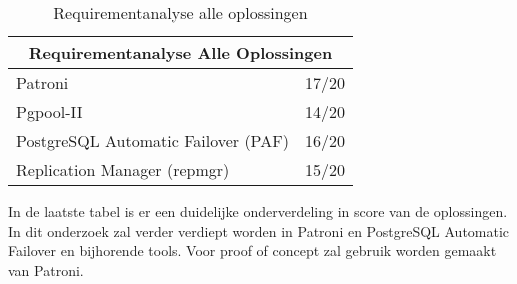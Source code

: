\begin{table}[!h]
    \centering
    \begin{tabular}{ |p{6cm}||p{6cm}|  }
        \hline
        \multicolumn{2}{|c|}{Requirementanalyse Alle Oplossingen} \\
        \hline
        Patroni & 17/20 \\
        \hline
        Pgpool-II & 14/20 \\
        \hline
        PostgreSQL Automatic Failover (PAF) & 16/20 \\
        \hline
        Replication Manager (repmgr) & 15/20 \\
        \hline
    \end{tabular}
    \caption{Requirementanalyse alle oplossingen}
    \label{table:Requirementanalyse alle oplossingen}
    In de laatste tabel is er een duidelijke onderverdeling in score van de oplossingen. In dit onderzoek zal verder verdiept worden in Patroni en PostgreSQL Automatic Failover en bijhorende tools. Voor proof of concept zal gebruik worden gemaakt van Patroni.
\end{table}


